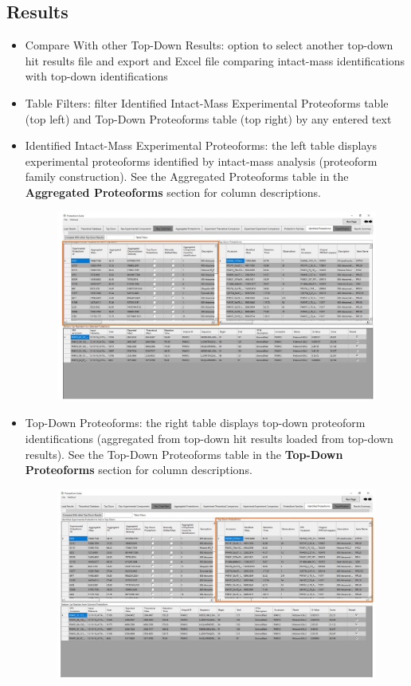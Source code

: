 \subsection{Results}
\begin{itemize}
	\item Compare With other Top-Down Results: option to select another top-down hit results file and export and Excel file comparing intact-mass identifications with top-down identifications
	\item Table Filters: filter Identified Intact-Mass Experimental Proteoforms table (top left) and Top-Down Proteoforms table (top right) by any entered text
	\item Identified Intact-Mass Experimental Proteoforms: the left table displays experimental proteoforms identified by intact-mass analysis (proteoform family construction).  See the Aggregated Proteoforms table in the \textbf{Aggregated Proteoforms} section for column descriptions. 
	\begin{figure}[h]
\centering
\includegraphics[scale=0.45]{figures/identified1.jpg}
\end{figure}
\pagebreak
\item Top-Down Proteoforms: the right table displays top-down proteoform identifications (aggregated from top-down hit results loaded from top-down results). See the Top-Down Proteoforms table in the \textbf{Top-Down Proteoforms} section for column descriptions.
	\begin{figure}[h]
\centering
\includegraphics[scale=0.45]{figures/identified2.jpg}

\end{figure}
\end{itemize}
